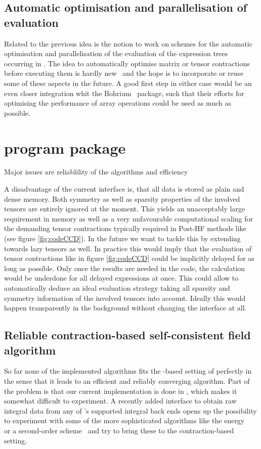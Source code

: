 \subsection{Automatic optimisation and parallelisation of evaluation}
Related to the previous idea
is the notion to work on schemes for the automatic
optimisation and parallelisation of the evaluation
of the expression trees occurring in \lazyten.
The idea to automatically optimise matrix or tensor contractions
before executing them is hardly new~\cite{Baumgartner2005,Peise2015,Xerus,Kristensen2016array,Kristensen2016streaming}
and the hope is to incorporate or reuse some of these aspects
in the future.
A good first step in either case would be an even closer integration
whit the Bohrium~\cite{Kristensen2016array,Kristensen2016streaming} package,
such that their efforts for optimising the performance
of array operations could be used as much as possible.


\section{\molsturm program package}

Major issues are reliablility of the algorithms
and efficiency

A disadvantage of the current \molsturm interface is,
that all data is stored as plain and dense memory.
Both symmetry as well as sparsity properties of the involved tensors
are entirely ignored at the moment.
This yields an unacceptably large requirement in memory
as well as a very unfavourable computational scaling
for the demanding tensor contractions
typically required in Post-HF methods like \CCD (see figure \ref{fig:codeCCD}).
In the future we want to tackle this by extending
\lazyten towards lazy tensors as well.
In practice this would imply that the evaluation of
tensor contractions like in figure \ref{fig:codeCCD} could be implicitly delayed
for as long as possible.
Only once the results are needed in the code,
the calculation would be underdone
for all delayed expressions at once.
This could allow to automatically deduce an ideal evaluation strategy
taking all sparsity and symmetry information
of the involved tensors into account.
Ideally this would happen transparently in the background
without changing the \python interface at all.


\subsection{Reliable contraction-based self-consistent field algorithm}
So far none of the implemented \SCF algorithms fits the \contraction-based
setting of \molsturm perfectly
in the sense that it leads to an efficient
and reliably converging \SCF algorithm.
Part of the problem is that our current \SCF implementation
is done in \cpp,
which makes it somewhat difficult to experiment.
A recently added \python interface to obtain raw integral data
from any of \molsturm's supported integral back ends
opens up the possibility to experiment
with some of the more sophisticated algorithms like
the energy \DIIS~\cite{Kudin2002}
or a second-order \SCF scheme~\cite{Salek2007,Hoest2008}
and try to bring these to the contraction-based setting.


